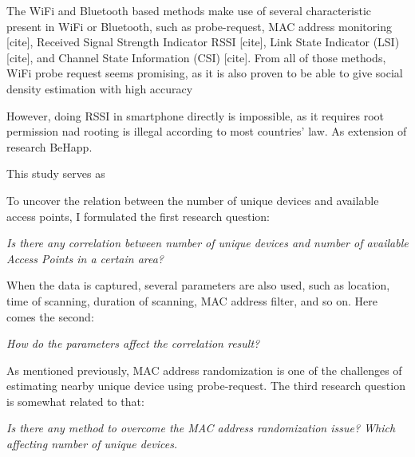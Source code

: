 The WiFi and Bluetooth based methods make use of several characteristic present in WiFi or Bluetooth, such as probe-request, MAC address monitoring [cite], Received Signal Strength Indicator \ac{RSSI} [cite], Link State Indicator (LSI) [cite], and Channel State Information (CSI) [cite]. From all of those methods, WiFi probe request seems promising, as it is also proven to be able to give social density estimation with high accuracy~\cite{}

However, doing \ac{RSSI} in smartphone directly is impossible, as it requires root permission nad rooting is illegal according to most countries' law. As extension of research BeHapp.


This study serves as 

To uncover the relation between the number of unique devices and available access points, I formulated the first research question:
\begin{displayquote}\textit{
Is there any correlation between number of unique devices and number of available Access Points in a certain area?}
\end{displayquote}

When the data is captured, several parameters are also used, such as location, time of scanning, duration of scanning, MAC address filter, and so on. Here comes the second:
\begin{displayquote}\textit{
How do the parameters affect the correlation result?}
\end{displayquote}

As mentioned previously, MAC address randomization is one of the challenges of estimating nearby unique device using probe-request. The third research question is somewhat related to that:
\begin{displayquote}\textit{
Is there any method to overcome the MAC address randomization issue? Which affecting number of unique devices.}
\end{displayquote}

